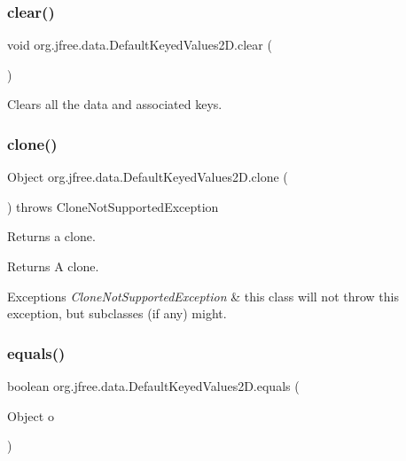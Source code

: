 \subsubsection{\texorpdfstring{clear()}{clear()}}
{\footnotesize\ttfamily void org.\+jfree.\+data.\+Default\+Keyed\+Values2\+D.\+clear (\begin{DoxyParamCaption}{ }\end{DoxyParamCaption})}

Clears all the data and associated keys. \mbox{\label{classorg_1_1jfree_1_1data_1_1_default_keyed_values2_d_abd02697b4dd0b559d70d8a660d71997e}} 
\subsubsection{\texorpdfstring{clone()}{clone()}}
{\footnotesize\ttfamily Object org.\+jfree.\+data.\+Default\+Keyed\+Values2\+D.\+clone (\begin{DoxyParamCaption}{ }\end{DoxyParamCaption}) throws Clone\+Not\+Supported\+Exception}

Returns a clone.

\begin{DoxyReturn}{Returns}
A clone.
\end{DoxyReturn}

\begin{DoxyExceptions}{Exceptions}
{\em Clone\+Not\+Supported\+Exception} & this class will not throw this exception, but subclasses (if any) might. \\
\hline
\end{DoxyExceptions}
\mbox{\label{classorg_1_1jfree_1_1data_1_1_default_keyed_values2_d_a4d2a2c564e7aff66a16e61288ebfb42e}} 
\subsubsection{\texorpdfstring{equals()}{equals()}}
{\footnotesize\ttfamily boolean org.\+jfree.\+data.\+Default\+Keyed\+Values2\+D.\+equals (\begin{DoxyParamCaption}\item[{Object}]{o }\end{DoxyParamCaption})}

